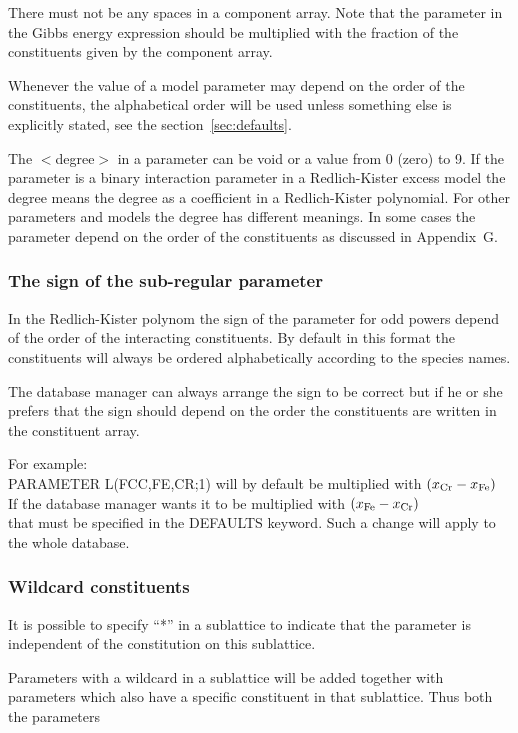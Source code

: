 \documentclass[12pt]{article}
\begin{document}
There must not be any spaces in a component array.  Note that the
parameter in the Gibbs energy expression should be multiplied with the
fraction of the constituents given by the component array.

Whenever the value of a model parameter may depend on the order of the
constituents, the alphabetical order will be used unless something
else is explicitly stated, see the section~\ref{sec:defaults}.

The $<$degree$>$ in a parameter can be void or a value from 0 (zero)
to 9.  If the parameter is a binary interaction parameter in a
Redlich-Kister excess model the degree means the degree as a
coefficient in a Redlich-Kister polynomial.  For other parameters and
models the degree has different meanings.  In some cases the parameter
depend on the order of the constituents as discussed in Appendix~G.

\subsubsection{The sign of the sub-regular parameter}\label{sec:subreg}

In the Redlich-Kister polynom the sign of the parameter for odd powers
depend of the order of the interacting constituents.  By default in
this format the constituents will always be ordered alphabetically
according to the species names.

The database manager can always arrange the sign to be correct but if
he or she prefers that the sign should depend on the order the
constituents are written in the constituent array.

For example:\\ PARAMETER L(FCC,FE,CR;1) will by default be multiplied
with $(x_{\rm Cr}-x_{\rm Fe})$\\ If the database manager wants it to
be multiplied with $(x_{\rm Fe}-x_{\rm Cr})$\\ that must be specified in
the DEFAULTS keyword.  Such a change will apply to the whole database.

\subsubsection{Wildcard constituents}

It is possible to specify ``*'' in a sublattice to indicate that the
parameter is independent of the constitution on this sublattice.

Parameters with a wildcard in a sublattice will be added together with
parameters which also have a specific constituent in that sublattice.
Thus both the parameters
\end{document}
